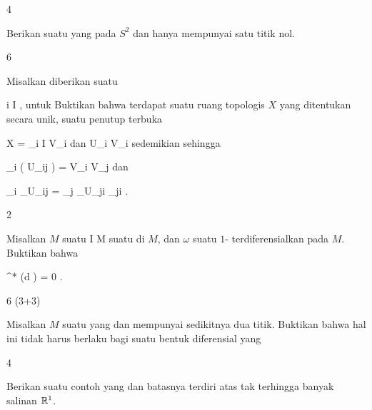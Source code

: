 {4}
{

Berikan suatu
 yang
pada $S^2$ dan hanya mempunyai satu titik nol.

}
{} {}

{6}
{

Misalkan diberikan suatu

 {}
 {i \in I} {}
 {} {} {} {,}
untuk
Buktikan bahwa terdapat suatu ruang topologis $X$ yang ditentukan secara unik, suatu penutup terbuka

\mavergleichskette
{\vergleichskette
{ X
}
{ = }{ \bigcup_{i \in I} V_i
}
{  }{
}
{    }{
}
{   }{
}
}
{}{}{}
dan
 {U_i } { V_i
} {}
sedemikian sehingga

\mavergleichskettedisp
{\vergleichskette
{ \psi_i  \left(  U_{ij}  \right)
}
{ =} { V_i \cap V_j
}
{ } {
}
{ } {
}
{ } {
}
}
{}{}{}
dan

\mavergleichskettedisp
{\vergleichskette
{ \psi_i \vert_{U_{ij} }
}
{ =} { \psi_j \vert_{U_{ji} }  \circ   \varphi_{ji}
}
{ } {
}
{ } {
}
{ } {
}
}
{}{}{}.

}
{} {}

{2}
{

Misalkan $M$ suatu
\maabb {\gamma} { I } { M
} {}
suatu
di $M$, dan $\omega$ suatu
$1$-
terdiferensialkan pada $M$. Buktikan bahwa

\mavergleichskettedisp
{\vergleichskette
{ \gamma^* (d \omega)
}
{ =} { 0
}
{ } {
}
{ } {
}
{ } {
}
}
{}{}{}.

}
{} {}

{6 (3+3)}
{

Misalkan $M$ suatu
yang
dan mempunyai sedikitnya dua titik.
 {Buktikan bahwa hal ini tidak harus berlaku bagi suatu bentuk diferensial yang
}

}
{} {}

{4}
{

Berikan suatu contoh
yang
dan batasnya terdiri atas
 {} {}
tak terhingga banyak salinan ${\mathbb R}^1$.

}
{} {}

